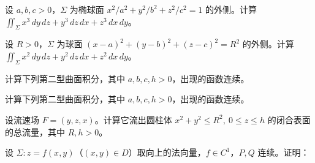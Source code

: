 \newpage
\noindent\begin{minipage}{\textwidth}
设 $a,b,c>0$，$\Sigma$ 为椭球面 $x^2/a^2+y^2/b^2+z^2/c^2=1$ 的外侧。计算 $\iint_\Sigma x^3\,dy\,dz+y^3\,dz\,dx+z^3\,dx\,dy$。
\end{minipage}\par\vfill
\noindent\begin{minipage}{\textwidth}
设 $R>0$，$\Sigma$ 为球面 $(x-a)^2+(y-b)^2+(z-c)^2=R^2$ 的外侧。计算 $\iint_\Sigma x^2\,dy\,dz+y^2\,dz\,dx+z^2\,dx\,dy$。
\end{minipage}\par\vfill
\noindent\begin{minipage}{\textwidth}
计算下列第二型曲面积分，其中 $a,b,c,h>0$，出现的函数连续。
\end{minipage}\par\vfill
\newpage
\noindent\begin{minipage}{\textwidth}
计算下列第二型曲面积分，其中 $a,b,c,h>0$，出现的函数连续。
\end{minipage}\par\vfill
\noindent\begin{minipage}{\textwidth}
设流速场 $F=(y,z,x)$。计算它流出圆柱体 $x^2+y^2\le R^2,\ 0\le z\le h$ 的闭合表面的总流量，其中 $R,h>0$。
\end{minipage}\par\vfill
\noindent\begin{minipage}{\textwidth}
设 $\Sigma:z=f(x,y)$（$(x,y)\in D$）取向上的法向量，$f\in C^1$，$P,Q$ 连续。证明：
\end{minipage}\par\vfill
